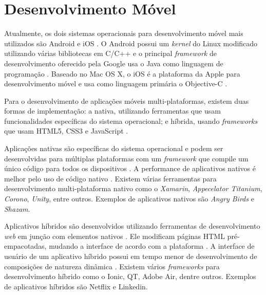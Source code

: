 \section{Desenvolvimento Móvel}

Atualmente, os dois sistemas operacionais para desenvolvimento móvel mais utilizados são Android e iOS \cite{gartner-top-os}. O Android possui um \textit{kernel} do Linux modificado utilizando várias bibliotecas em C/C++ \cite{mobile-dev} e o principal \textit{framework} de desenvolvimento oferecido pela Google usa o Java como linguagem de programação \cite{android}. Baseado no Mac OS X, o iOS é a plataforma da Apple para desenvolvimento móvel e usa como linguagem primária o Objective-C \cite{mobile-dev}. 

Para o desenvolvimento de aplicações móveis multi-plataformas, existem duas formas de implementação: a nativa, utilizando ferramentas que usam funcionalidades específicas do sistema operacional; e híbrida, usando \textit{frameworks} que usam HTML5, CSS3 e JavaScript \cite{mobile-dev-2}.

Aplicações nativas são específicas do sistema operacional e podem ser desenvolvidas para múltiplas plataformas com um \textit{framework} que compile um único código para todos os dispositivos \cite{hybrid-1}. A performance de aplicativos nativos é melhor pelo uso de código nativo \cite{hybrid-2}. Existem várias ferramentas para desenvolvimento multi-plataforma nativo como o \textit{Xamarin}, \textit{Appecelator Titanium}, \textit{Corono}, \textit{Unity}, entre outros. Exemplos de aplicativos nativos são \textit{Angry Birds} e \textit{Shazam}.

Aplicativos híbridos são desenvolvidos utilizando ferramentas de desenvolvimento \textit{web} em junção com elementos nativos \cite{hybrid-1}. Ele modificam páginas HTML pré-empacotadas, mudando a interface de acordo com a plataforma \cite{hybrid-2}. A interface de usuário de um aplicativo híbrido possui em tempo menor de desenvolvimento de composições de natureza dinâmica \cite{mobile-dev-2}. Existem vários \textit{frameworks} para desenvolvimento híbrido como o Ionic, QT, Adobe Air, dentre outros. Exemplos de aplicativos híbridos são Netflix e Linkedin.
